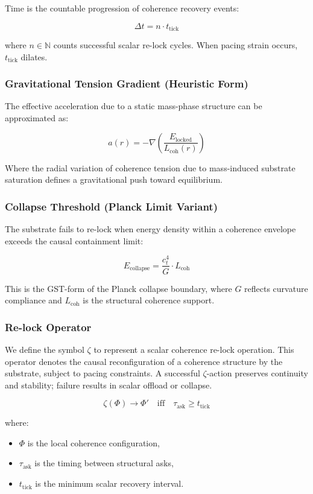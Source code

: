 \documentclass[entropy,article,submit,pdftex,moreauthors]{Definitions/mdpi}
\begin{document}
Time is the countable progression of coherence recovery events:

\[
\Delta t = n \cdot t_{\text{tick}}
\]

where \( n \in \mathbb{N} \) counts successful scalar re-lock cycles. When pacing strain occurs, \( t_{\text{tick}} \) dilates.

\subsubsection{Gravitational Tension Gradient (Heuristic Form)}

The effective acceleration due to a static mass-phase structure can be approximated as:

\[
a(r) = -\nabla \left( \frac{E_{\text{locked}}}{L_{\text{coh}}(r)} \right)
\]

Where the radial variation of coherence tension due to mass-induced substrate saturation defines a gravitational push toward equilibrium.

\subsubsection{Collapse Threshold (Planck Limit Variant)}

The substrate fails to re-lock when energy density within a coherence envelope exceeds the causal containment limit:

\[
E_{\text{collapse}} = \frac{c_t^4}{G} \cdot L_{\text{coh}}
\]

This is the GST-form of the Planck collapse boundary, where \( G \) reflects curvature compliance and \( L_{\text{coh}} \) is the structural coherence support.


\subsubsection{Re-lock Operator}

We define the symbol \( \zeta \) to represent a scalar coherence re-lock operation. This operator denotes the causal reconfiguration of a coherence structure by the substrate, subject to pacing constraints. A successful \( \zeta \)-action preserves continuity and stability; failure results in scalar offload or collapse.

\[
\zeta(\Phi) \rightarrow \Phi' \quad \text{iff} \quad \tau_{\text{ask}} \geq t_{\text{tick}}
\]

where:
\begin{itemize}
    \item \( \Phi \) is the local coherence configuration,
    \item \( \tau_{\text{ask}} \) is the timing between structural asks,
    \item \( t_{\text{tick}} \) is the minimum scalar recovery interval.
\end{itemize}
\end{document}

